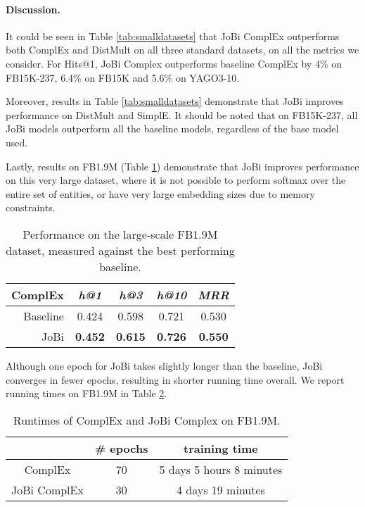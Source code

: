 \documentclass[11pt,a4paper, dvipsnames]{article}
\begin{document}
\paragraph{Discussion.} It could be seen in Table \ref{tab:smalldatasets} that JoBi ComplEx outperforms both ComplEx and DistMult on all three standard datasets, on all the metrics we consider. For Hits@1, JoBi Complex outperforms baseline ComplEx by 4\% on FB15K-237, 6.4\% on FB15K and 5.6\% on YAGO3-10. 

Moreover, results in Table \ref{tab:smalldatasets} demonstrate that JoBi improves performance on DistMult and SimplE. It should be noted that on FB15K-237, all JoBi models outperform all the baseline models, regardless of the base model used.

Lastly, results on FB1.9M (Table \ref{tab:fb2p6m}) demonstrate that JoBi improves performance on this very large dataset, where it is not possible to perform softmax over the entire set of entities, or have very large embedding sizes due to memory constraints. 

\begin{table}[t!] \centering
    \small
    \begin{tabular}{r | c c c c  }
       \textbf{ComplEx} & \textit{h@1} & \textit{h@3} & \textit{h@10} & \textit{MRR} \\
         \hline 
         Baseline & 0.424 & 0.598 & 0.721 & 0.530 \\
         JoBi  & \textbf{0.452} & \textbf{0.615} & \textbf{0.726} & \textbf{0.550}
        
         
    \end{tabular}
    \caption{Performance on the large-scale FB1.9M dataset, measured against the best performing baseline.}
    \label{tab:fb2p6m}
\end{table}

Although one epoch for JoBi takes slightly longer than the baseline, JoBi converges in fewer epochs, resulting in shorter running time overall. We report running times on FB1.9M in Table \ref{tab:runtime}.

\begin{table}[t!]
    \centering
    \small
    \begin{tabular}{c | c | c}
    & \textbf{\# epochs} & \textbf{training time} \\
    \hline
    ComplEx & 70 & 5 days 5 hours 8 minutes \\
    JoBi ComplEx & 30 & 4 days 19 minutes 
    \end{tabular}
    \caption{Runtimes of ComplEx and JoBi Complex on FB1.9M.}
    \label{tab:runtime}
\end{table}
\end{document}
